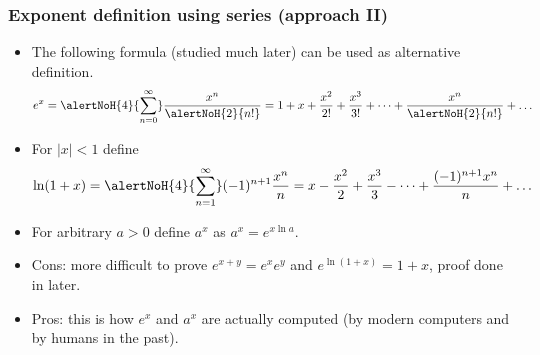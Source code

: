 \begin{frame}
\frametitle{Exponent definition using series (approach II)}
\begin{itemize}
\item<1-> The following formula (studied much later) can be used as alternative definition.
\[
e^{x}=\alertNoH{4}{\sum_{n=0}^{\infty}} \frac{x^n}{\alertNoH{2}{n!}}= 1+ x+\frac{x^2}{2!}+\frac{x^3}{3!}+\dots + \frac{x^{n}}{\alertNoH{2}{n!}}+\dots
\]
\item<3-> For $|x|<1$ define 
\[
\ln (1+x)=\alertNoH{4}{\sum_{n=1}^{\infty}} (-1)^{n+1}\frac{x^n}{n}=  x-\frac{x^2}{2}+\frac{x^3}{3}-\dots + \frac{(-1)^{n+1}x^{n}}{n}+\dots
\]
\item<5-> For arbitrary $a>0$ define $a^x$ as $a^x=e^{x\ln a}$. 
\item<6-> Cons: more difficult to prove $e^{x+y}= e^{x} e^y$ and $e^{\ln(1+x)}=1+x$, proof done in later.
\item<7-> Pros: this is how $e^x$ and $a^x$ are actually computed (by modern computers and by humans in the past).
\end{itemize}
\end{frame}

